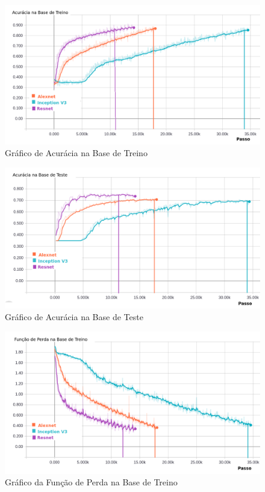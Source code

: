 \begin{figure}
\centering
\includegraphics[scale=0.5]{figuras/accuracy.png}
\caption{Gráfico de Acurácia na Base de Treino}
\label{fig:acc-train}
\end{figure}

\begin{figure}
\centering
\includegraphics[scale=0.5]{figuras/accuracy_val.png}
\caption{Gráfico de Acurácia na Base de Teste}
\label{fig:acc-val}
\end{figure}

\begin{figure}
\centering
\includegraphics[scale=0.5]{figuras/loss.png}
\caption{Gráfico da Função de Perda na Base de Treino}
\label{fig:loss-train}
\end{figure}

